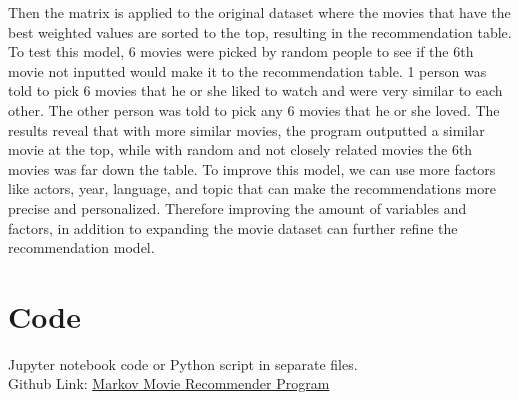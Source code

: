 \documentclass{article}
\begin{document}
Then the matrix is applied to the original dataset where the movies that have
the best weighted values are sorted to the top, resulting in the recommendation table. To test this model, 6 movies were picked by random people to see if the 6th movie not
inputted would make it to the recommendation table. 1 person was told to pick 6 movies that he or she liked to watch and were very similar to each other. The other
person was told to pick any 6 movies that he or she loved. The results reveal that with more similar movies, the program outputted a similar movie at the top, while
with random and not closely related movies the 6th movies was far down the table. To improve this model, we can use more factors like actors, year, language, and topic that can 
make the recommendations more precise and personalized. Therefore improving the amount of variables and factors, in addition to expanding the movie dataset can further refine the
recommendation model.

\section{Code}

Jupyter notebook code or Python script in separate files.\\
Github Link: \href{https://github.com/ishaansathaye/LinAlg-MultivarCalc/blob/main/MarkovProject/MarkovRecommendation/MovieRecommender.ipynb}{Markov Movie Recommender Program}
\end{document}
